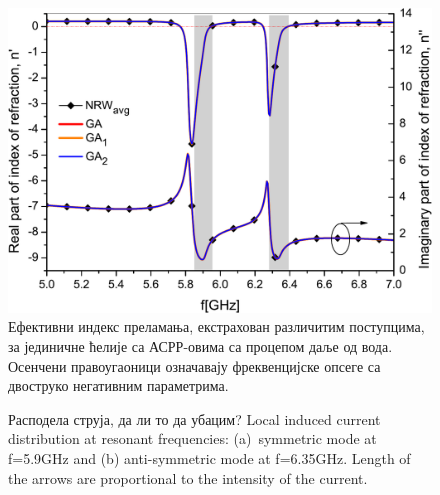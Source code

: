 \begin{figure}[!t]
\centering
\includegraphics[scale=\SkalaB]{slike/8b.pdf}
\caption{Ефективни индекс преламања, екстрахован различитим поступцима, за јединичне ћелије са АСРР-овима са процепом даље од вода. Осенчени правоугаоници означавају фреквенцијске опсеге са двоструко негативним параметрима.}
\label{fig8b}
\end{figure} 
\begin{figure}[!t]
\hfill
{}
\caption{Расподела струја, да ли то да убацим? Local induced current distribution at resonant frequencies: (a)~symmetric mode at f=5.9GHz and (b) anti-symmetric mode at f=6.35GHz. Length of the arrows are proportional to the intensity of the current.}
\label{fig9}
\end{figure}

